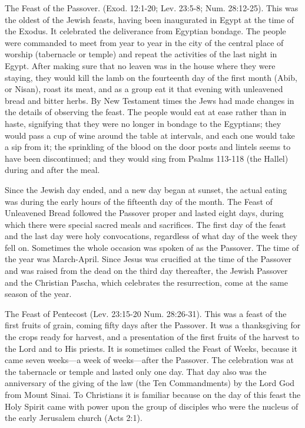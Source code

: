 The Feast of the Passover. (Exod. 12:1-20; Lev. 23:5-8; Num. 28:12-25). This was the oldest of the Jewish feasts, having been inaugurated in Egypt at the time of the Exodus. It celebrated the deliverance from Egyptian bondage. The people were commanded to meet from year to year in the city of the central place of worship (tabernacle or temple) and repeat the activities of the last night in Egypt. After making sure that no leaven was in the house where they were staying, they would kill the lamb on the fourteenth day of the first month (Abib, or Nisan), roast its meat, and as a group eat it that evening with unleavened bread and bitter herbs. By New Testament times the Jews had made changes in the details of observing the feast. The people would eat at ease rather than in haste, signifying that they were no longer in bondage to the Egyptians; they would pass a cup of wine around the table at intervals, and each one would take a sip from it; the sprinkling of the blood on the door posts and lintels seems to have been discontinued; and they would sing from Psalms 113-118 (the Hallel) during and after the meal.

Since the Jewish day ended, and a new day began at sunset, the actual eating was during the early hours of the fifteenth day of the month. The Feast of Unleavened Bread followed the Passover proper and lasted eight days, during which there were special sacred meals and sacrifices. The first day of the feast and the last day were holy convocations, regardless of what day of the week they fell on. Sometimes the whole occasion was spoken of as the Passover. The time of the year was March-April. Since Jesus was crucified at the time of the Passover and was raised from the dead on the third day thereafter, the Jewish Passover and the Christian Pascha, which celebrates the resurrection, come at the same season of the year.

The Feast of Pentecost (Lev. 23:15-20 Num. 28:26-31). This was a feast of the first fruits of grain, coming fifty days after the Passover. It was a thanksgiving for the crops ready for harvest, and a presentation of the first fruits of the harvest to the Lord and to His priests. It is sometimes called the Feast of Weeks, because it came seven weeks---a week of weeks---after the Passover. The celebration was at the tabernacle or temple and lasted only one day. That day also was the anniversary of the giving of the law (the Ten Commandments) by the Lord God from Mount Sinai. To Christians it is familiar because on the day of this feast the Holy Spirit came with power upon the group of disciples who were the nucleus of the early Jerusalem church (Acts 2:1).

